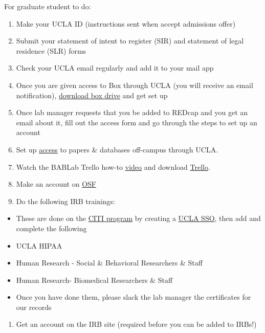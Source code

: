 \documentclass[]{book}
\providecommand{\tightlist}{%
  \setlength{\itemsep}{0pt}\setlength{\parskip}{0pt}}
\begin{document}
For graduate student to do:

\begin{enumerate}
\def\labelenumi{\arabic{enumi}.}
\tightlist
\item
  Make your UCLA ID (instructions sent when accept admissions offer)
\item
  Submit your statement of intent to register (SIR) and statement of legal residence (SLR) forms
\item
  Check your UCLA email regularly and add it to your mail app
\item
  Once you are given access to Box through UCLA (you will receive an email notification), \href{https://www.box.com/resources/downloads}{download box drive} and get set up
\item
  Once lab manager requests that you be added to REDcap and you get an email about it, fill out the access form and go through the steps to set up an account
\item
  Set up \href{https://www.library.ucla.edu/use/computers-computing-services/connect-campus}{access} to papers \& databases off-campus through UCLA.
\item
  Watch the BABLab Trello how-to \href{https://www.youtube.com/watch?v=_Ry-SnJygy8\&feature=youtu.be\&ab_channel=BABLab}{video} and download \href{https://trello.com/en-US/platforms}{Trello}.
\item
  Make an account on \href{https://accounts.osf.io/login?service=https://osf.io/myprojects/}{OSF}
\item
  Do the following IRB trainings:
\end{enumerate}

\begin{itemize}
\tightlist
\item
  These are done on the \href{https://www.research.ucla.edu/CITIProgram/}{CITI program} by creating a \href{https://ora.research.ucla.edu/OHRPP/Documents/Education/SSO_CITI_New_Acct.pdf}{UCLA SSO}, then add and complete the following
\item
  UCLA HIPAA
\item
  Human Research - Social \& Behavioral Researchers \& Staff
\item
  Human Research- Biomedical Researchers \& Staff
\item
  Once you have done them, please slack the lab manager the certificates for our records
\end{itemize}

\begin{enumerate}
\def\labelenumi{\arabic{enumi}.}
\setcounter{enumi}{9}
\tightlist
\item
  Get an account on the IRB site (required before you can be added to IRBs!)
\end{enumerate}
\end{document}
